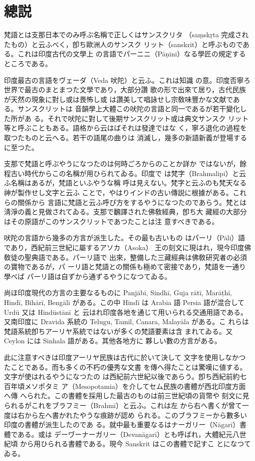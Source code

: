 
\chapter*{總説}
\label{cha:general}

\numberParagraph
梵語とは支那日本でのみ呼ぶ名稱で正しくはサンスクリタ
（saṃskṛta 完成されたもの）と云ふべく，卽ち歐洲人のサンスク
リット（sanskrit）と呼ぶものである。これは印度古代の文學上
の言語でパーニニ（Pāṇini）なる學匠の規定するところである。

印度最古の言語をヴェーダ（Veda 吠陀）と云ふ。これは知識
の意。印度否寧ろ世界で最古のまとまつた文學であり，大部分讚
歌の形で出來て居り，古代民族が天然の現象に對し或は畏怖し或
は讚美して唱詠せし宗敎味豐かな文献である。サンスクリットは
音韻學上大體この吠陀の言語と同一であるが若干變化した所があ
る。それで吠陀に對して後期サンスクリット或は典文サンスク
リット等と呼ぶこともある。語格から云はばそれは發達ではな
く，寧ろ退化の過程を取つたものと云へる。若干の語尾の曲りは
消滅し，幾多の新語新義が登場するに至つた。

支那で梵語と呼ぶやうになつたのは何時ごろからのことか詳か
ではないが，餘程古い時代からこの名稱が用ひられてゐる。印度で
は梵字（Brahmalipi）と云ふ名稱はあるが，梵語といふやうな稱
呼は見えない。梵字と云ふのも梵天なる神が製作せし文字と云ふ
ことで，やはりインドの古い傳説に根據がある。これらの關係から
言語に梵語と云ふ呼び方をするやうになつたのであらう。梵とは
淸淨の義と見做されてゐる。支那で飜譯された佛敎經典，卽ち大
藏經の大部分はその原語がこのサンスクリットであつたことは注
意すべきである。

\numberParagraph
吠陀の言語から幾多の方言が派生した。その最も古いもの
はパーリ（Pāli）語であり，西紀前三世紀に屬するアソカ（Asoka）
王の刻文に現はれ，現今印度佛敎徒の聖典語である。パーリ語で
出來，整備した三藏經典は佛敎研究者の必須の寶物であるが，パ
ーリ語と梵語との關係も極めて密接であり，梵語を一通り學べば
パーリ語は自ずから通ずるやうになつてゐる。

尚ほ印度現代の方言の主要なるものに Panjābī, Sindhī, Guja\-%
rātī, Marāṭhī, Hindī, Bihārī, Bengālī がある。この中 Hindī
は Arabia 語 Persia 語が混合して Urdū 又は Hindūstānī と
云はれ印度各地を通じて用いられる交通用語である。又南印度に
Dravida 系統の Telugu, Tamil, Canara, Malayāla がある。こ
れらは梵語系統卽ちアーリヤ系統ではないが多くの梵語要素は含
まれてゐる。又 Ceylon には Sinhala 語がある。其他各地方に
夥しい數の方言がある。

\numberParagraph
此に注意すべきは印度アーリヤ民族は古代に於いて決して
文字を使用しなかつたことである。而も多くの不朽の優秀な文書
を傳へ得たことは驚嘆に値する。文字が使はれるやうになつたの
は西紀前六世紀以後であらう。卽ち西紀前約七百年頃メソポタミ
ア（Mesopotamia）を介してセム民族の書體が西北印度方面へ傳
へられた。この書體を採用した最古のものは前三世紀頃の貨幣や
刻文に見られるがこれをブラフミー（Brahmī）と云ふ。これは左
から右へ書くが曾て一度は右から左へ書かれたやうな痕跡が認め
られる。このブラフミーから數多い印度の書體が派生したのであ
る。就中最も重要なるはナーガリー（Nāgarī）書體である。或は
デーヷーナーガリー（Devanāgarī）とも呼ばれ，大體紀元八世紀頃
から用ひられる書體である。現今 Sanskrit はこの書體で記すこ
とになつてゐる。

